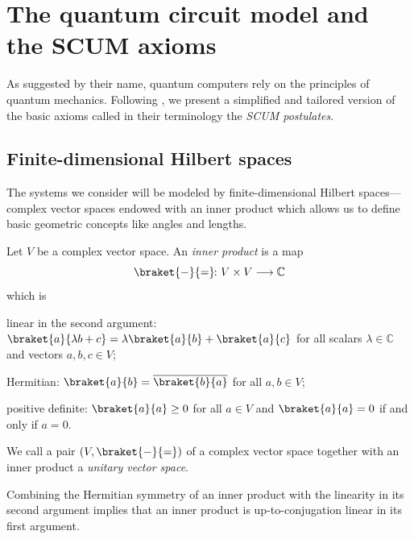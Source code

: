 \documentclass[a4paper, oneside, 12pt]{amsart}
\begin{document}
\section{The quantum circuit model and the SCUM axioms}\label{sec:the-quantum-circuit-model-and-the-scum-axioms}
As suggested by their name, quantum computers rely on the principles of quantum mechanics.
Following \cite[Section~2]{kissinger-wetering2025:PicturingQuantumSoftware}, we present a simplified and tailored version of the basic axioms called in their terminology the  \emph{SCUM postulates}.

\subsection{Finite-dimensional Hilbert spaces}\label{sec:finite-dimensional-hilbert-spaces}
The systems we consider will be modeled by finite-dimensional Hilbert spaces---complex vector spaces endowed with an inner product which allows us to define basic geometric concepts like angles and lengths.


\begin{definition}\label{def:unitary-vector-space}
  Let \(V\) be a complex vector space.
  An \emph{inner product} is a map
  \begin{equation*}
    \braket{\blank}{\bblank} \from V\times V \to \mathbb{C}
  \end{equation*}
  which is
  \begin{thmlist}
    \item linear in the second argument: \(\braket{a}{\lambda b + c} = \lambda \braket{a}{b} + \braket{a}{c}\) for all scalars \(\lambda \in \mathbb{C}\) and vectors \(a,b,c \in V\);
    \item Hermitian: \(\braket{a}{b} = \overline{\braket{b}{a}}\) for all \(a, b \in V\);
    \item positive definite: \(\braket{a}{a} \geq 0 \)  for all \(a\in V\) and \(\braket{a}{a} = 0\) if and only if \(a = 0\).
  \end{thmlist}
  We call a pair \((V, \braket{\blank}{\bblank})\) of a complex vector space together with an inner product a \emph{unitary vector space}.
\end{definition}

Combining the Hermitian symmetry of an inner product with the linearity in its second argument implies that an inner product is up-to-conjugation linear in its first argument.
\end{document}
